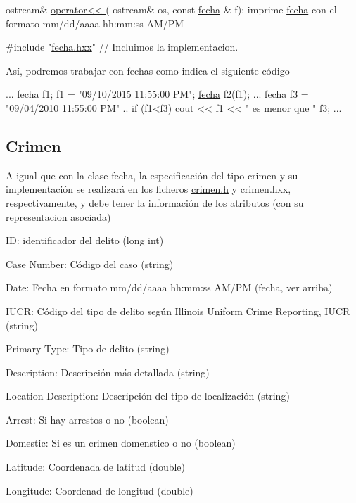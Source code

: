 \begin{DoxyCode}
 ostream& \hyperlink{fecha_8h_a9787de38b43ae62ba2c0812f3dd18394}{operator<< }( ostream& os, \textcolor{keyword}{const} \hyperlink{classfecha}{fecha} & f); imprime 
      \hyperlink{classfecha}{fecha} con el formato  mm/dd/aaaa hh:mm:ss AM/PM

\textcolor{preprocessor}{#include "\hyperlink{fecha_8hxx}{fecha.hxx}"} \textcolor{comment}{// Incluimos la implementacion.}
\end{DoxyCode}


Así, podremos trabajar con fechas como indica el siguiente código 
\begin{DoxyCode}
...
fecha f1;
f1 = \textcolor{stringliteral}{"09/10/2015 11:55:00 PM"};
\hyperlink{classfecha}{fecha} f2(f1);
...
fecha f3 = \textcolor{stringliteral}{"09/04/2010 11:55:00 PM"}
..
\textcolor{keywordflow}{if} (f1<f3) 
  cout << f1 << \textcolor{stringliteral}{" es menor que "} f3;
...
\end{DoxyCode}
\hypertarget{index_crime}{}\subsection{Crimen}\label{index_crime}
A igual que con la clase fecha, la especificación del tipo crimen y su implementación se realizará en los ficheros \hyperlink{crimen_8h}{crimen.\-h} y crimen.\-hxx, respectivamente, y debe tener la información de los atributos (con su representacion asociada)

\begin{DoxyItemize}
\item I\-D\-: identificador del delito (long int) \item Case Number\-: Código del caso (string) \item Date\-: Fecha en formato mm/dd/aaaa hh\-:mm\-:ss A\-M/\-P\-M (fecha, ver arriba) \item I\-U\-C\-R\-: Código del tipo de delito según Illinois Uniform Crime Reporting, I\-U\-C\-R (string) \item Primary Type\-: Tipo de delito (string) \item Description\-: Descripción más detallada (string) \item Location Description\-: Descripción del tipo de localización (string) \item Arrest\-: Si hay arrestos o no (boolean) \item Domestic\-: Si es un crimen domenstico o no (boolean) \item Latitude\-: Coordenada de latitud (double) \item Longitude\-: Coordenad de longitud (double)\end{DoxyItemize}


